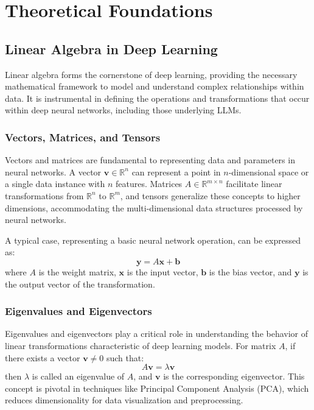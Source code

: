 \chapter{Theoretical Foundations}

\section{Linear Algebra in Deep Learning}
Linear algebra forms the cornerstone of deep learning, providing the necessary mathematical framework to model and understand complex relationships within data. It is instrumental in defining the operations and transformations that occur within deep neural networks, including those underlying LLMs.

\subsection{Vectors, Matrices, and Tensors}
Vectors and matrices are fundamental to representing data and parameters in neural networks. A vector $\mathbf{v} \in \mathbb{R}^n$ can represent a point in $n$-dimensional space or a single data instance with $n$ features. Matrices $A \in \mathbb{R}^{m \times n}$ facilitate linear transformations from $\mathbb{R}^n$ to $\mathbb{R}^m$, and tensors generalize these concepts to higher dimensions, accommodating the multi-dimensional data structures processed by neural networks.

A typical case, representing a basic neural network operation, can be expressed as:
\begin{equation}
    \mathbf{y} = A\mathbf{x} + \mathbf{b}
    \label{eq:matrix_multiplication}
\end{equation}
where $A$ is the weight matrix, $\mathbf{x}$ is the input vector, $\mathbf{b}$ is the bias vector, and $\mathbf{y}$ is the output vector of the transformation.

\subsection{Eigenvalues and Eigenvectors}
Eigenvalues and eigenvectors play a critical role in understanding the behavior of linear transformations characteristic of deep learning models. For matrix $A$, if there exists a vector $\mathbf{v} \neq 0$ such that:
\begin{equation}
    A\mathbf{v} = \lambda\mathbf{v}
    \label{eq:eigen}
\end{equation}
then $\lambda$ is called an eigenvalue of $A$, and $\mathbf{v}$ is the corresponding eigenvector. This concept is pivotal in techniques like Principal Component Analysis (PCA), which reduces dimensionality for data visualization and preprocessing.

